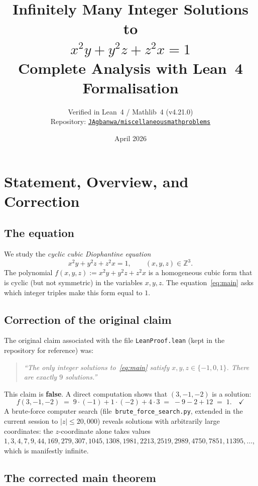 \documentclass[12pt,a4paper]{article}
\title{%
  \Large\bfseries Infinitely Many Integer Solutions to\\[6pt]
  \Huge $x^2y + y^2z + z^2x = 1$\\[10pt]
  \large Complete Analysis with Lean~4 Formalisation
}
\author{%
  \normalsize Verified in Lean~4 / Mathlib~4 (v4.21.0)\\[2pt]
  \normalsize Repository: \href{https://github.com/JAgbanwa/miscellaneousmathproblems}%
    {\texttt{JAgbanwa/miscellaneousmathproblems}}
}
\date{\normalsize April 2026}
\theoremstyle{definition}
\newcommand{\Z}{\mathbb{Z}}
\begin{document}
\maketitle
\tableofcontents
\newpage

\section{Statement, Overview, and Correction}\label{sec:intro}

\subsection{The equation}

We study the \emph{cyclic cubic Diophantine equation}
\begin{equation}\label{eq:main}
  x^2y + y^2z + z^2x = 1, \qquad (x,y,z)\in\Z^3. \tag{$\star$}
\end{equation}
The polynomial $f(x,y,z) := x^2y + y^2z + z^2x$ is a homogeneous
cubic form that is cyclic (but not symmetric) in the variables
$x, y, z$.  The equation~\eqref{eq:main} asks which integer triples
make this form equal to $1$.

\subsection{Correction of the original claim}

The original claim associated with the file \texttt{LeanProof.lean}
(kept in the repository for reference) was:

\begin{quote}
  \emph{``The only integer solutions to~\eqref{eq:main} satisfy
  $x,y,z\in\{-1,0,1\}$.  There are exactly $9$ solutions.''}
\end{quote}

This claim is \textbf{false}.  A direct computation shows that
$(3,-1,-2)$ is a solution:
\[
  f(3,-1,-2) \;=\; 9\cdot(-1) + 1\cdot(-2) + 4\cdot 3
            \;=\; -9 - 2 + 12 \;=\; 1. \quad\checkmark
\]
A brute-force computer search
(file~\texttt{brute\_force\_search.py}, extended in the current session
to $|z|\le 20{,}000$) reveals solutions with arbitrarily large
coordinates: the $z$-coordinate alone takes values $1, 3, 4, 7, 9, 44,
169, 279, 307, 1045, 1308, 1981, 2213, 2519, 2989, 4750, 7851, 11395,
\ldots$, which is manifestly infinite.

\subsection{The corrected main theorem}
\end{document}
